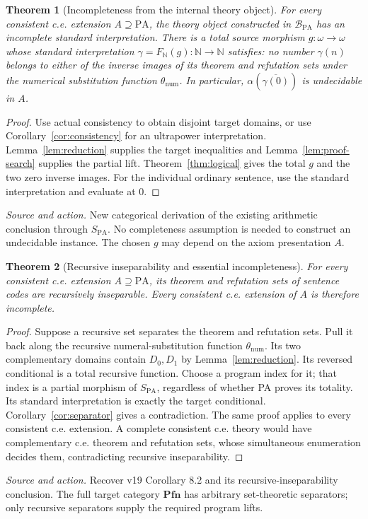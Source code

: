 \documentclass[11pt]{article}
\newtheorem{theorem}{Theorem}[section]
\theoremstyle{definition}\newtheorem{definition}[theorem]{Definition}
\newcommand{\PA}{\mathrm{PA}}
\newcommand{\N}{\mathbb N}
\newcommand{\Pfn}{\mathbf{Pfn}}
\newcommand{\B}{\mathcal B}
\newcommand{\source}[1]{\par\smallskip\noindent\textit{Source and action.} #1\par\smallskip}
\begin{document}
\begin{theorem}[Incompleteness from the internal theory object]\label{thm:arithmetic-incomplete}
For every consistent c.e. extension $A\supseteq\PA$, the theory
object constructed in $\B_{\PA}$ has an incomplete standard
interpretation. There is a total source morphism
$g:\omega\to\omega$ whose standard interpretation
$\gamma=F_{\N}(g):\N\to\N$ satisfies: no number $\gamma(n)$ belongs to either
of the inverse images of its theorem and refutation sets under
the numerical substitution function $\theta_{\mathrm{num}}$. In particular,
$\alpha(\overline{\gamma(0)})$ is undecidable in $A$.
\end{theorem}
\begin{proof}
Use actual consistency to obtain disjoint target domains, or use
Corollary~\ref{cor:consistency} for an ultrapower interpretation.
Lemma~\ref{lem:reduction} supplies the target inequalities and
Lemma~\ref{lem:proof-search} supplies the partial lift.
Theorem~\ref{thm:logical} gives the total $g$ and the two zero
inverse images. For the individual ordinary sentence, use the
standard interpretation and evaluate at $0$.
\end{proof}
\source{New categorical derivation of the existing arithmetic conclusion through $S_{\PA}$. No completeness assumption is needed to construct an undecidable instance. The chosen $g$ may depend on the axiom presentation $A$.}

\begin{theorem}[Recursive inseparability and essential incompleteness]\label{thm:arithmetic-insep}
For every consistent c.e. extension $A\supseteq\PA$, its theorem
and refutation sets of sentence codes are recursively inseparable.
Every consistent c.e. extension of $A$ is therefore incomplete.
\end{theorem}
\begin{proof}
Suppose a recursive set separates the theorem and refutation sets.
Pull it back along the recursive numeral-substitution function
$\theta_{\mathrm{num}}$.
Its two complementary domains contain $D_0,D_1$ by
Lemma~\ref{lem:reduction}. Its reversed conditional is a total
recursive function. Choose a program index for it; that index is
a partial morphism of $S_{\PA}$, regardless of whether PA proves
its totality. Its standard interpretation is exactly the target
conditional. Corollary~\ref{cor:separator} gives a contradiction.
The same proof applies to every consistent c.e. extension. A
complete consistent c.e. theory would have complementary c.e.
theorem and refutation sets, whose simultaneous enumeration decides
them, contradicting recursive inseparability.
\end{proof}
\source{Recover v19 Corollary 8.2 and its recursive-inseparability conclusion. The full target category $\Pfn$ has arbitrary set-theoretic separators; only recursive separators supply the required program lifts.}
\end{document}
